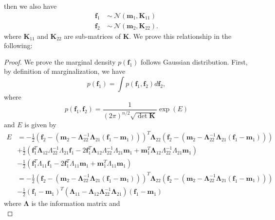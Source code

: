 \documentclass[12pt,a4paper]{article}
\theoremstyle{definition}
\numberwithin{equation}{section}
\let\vec\mathbf
\begin{document}
then we also have 
\begin{equation*} \label{}
\begin{split}
\vec f_1\ & \sim \ \mathcal N \left(\vec m_1 , \vec K_{11} \right)\\
\vec f_2\ & \sim \ \mathcal N \left(\vec m_2 , \vec K_{22} \right).
\end{split}
\end{equation*}
where $\vec K_{11}$ and  $\vec K_{22}$ are sub-matrices of $\vec K$. We prove this relationship in the following:
\begin{proof}
	We prove the marginal density $p(\vec f_1)$ follows Gaussian distribution. First, by definition of marginalization, we have
	\begin{equation*} \label{}
	p(\vec f_1) = \int p(\vec f_1,\vec f_2)d \vec f_2,
	\end{equation*}
	where 
	\begin{equation*} \label{}
	p(\vec f_1,\vec f_2) = \frac{1}{(2\pi)^{n/2}\sqrt{\det \vec K}}\exp{(E)}
	\end{equation*}
	and $E$ is given by
		\begin{equation*} \label{}
		\begin{split}
		E &= -\frac{1}{2}\left(\vec f_2-(\vec m_2 - \vec\Lambda_{22}^{-1} \vec\Lambda_{21}(\vec f_1 - \vec m_1))\right)^T\vec\Lambda_{22}\left(\vec f_2-(\vec m_2 - \vec\Lambda_{22}^{-1} \vec\Lambda_{21}(\vec f_1 - \vec m_1))\right)\\
		&+\frac{1}{2}\left(\vec f_1^T \vec\Lambda_{12}\Lambda_{22}^{-1}\Lambda_{21}\vec f_1 - 2\vec f_1^T \vec\Lambda_{12}\Lambda_{22}^{-1}\Lambda_{21}\vec m_1 + \vec m_1^T \vec\Lambda_{12}\Lambda_{22}^{-1}\Lambda_{21}\vec m_1\right)\\
		&-\frac{1}{2}\left(\vec f_1^T\Lambda_{11}\vec f_1 - 2\vec f_1^T\Lambda_{11}\vec m_1 + \vec m_1^T\Lambda_{11}\vec m_1\right)\\
		&=-\frac{1}{2}\left(\vec f_2-(\vec m_2 - \vec\Lambda_{22}^{-1} \vec\Lambda_{21}(\vec f_1 - \vec m_1))\right)^T\vec\Lambda_{22}\left(\vec f_2-(\vec m_2 - \vec\Lambda_{22}^{-1} \vec\Lambda_{21}(\vec f_1 - \vec m_1))\right)\\
		&-\frac{1}{2}\left(\vec f_1 - \vec m_1\right)^T\left(\vec\Lambda_{11}-\vec\Lambda_{12}\vec\Lambda_{22}^{-1}\vec\Lambda_{21}\right)\left(\vec f_1 - \vec m _1 \right)
		\end{split}
		\end{equation*}
	where $\vec\Lambda$ is the information matrix and
	\begin{equation*} \label{}

\end{equation*}
\end{proof}
\end{document}
